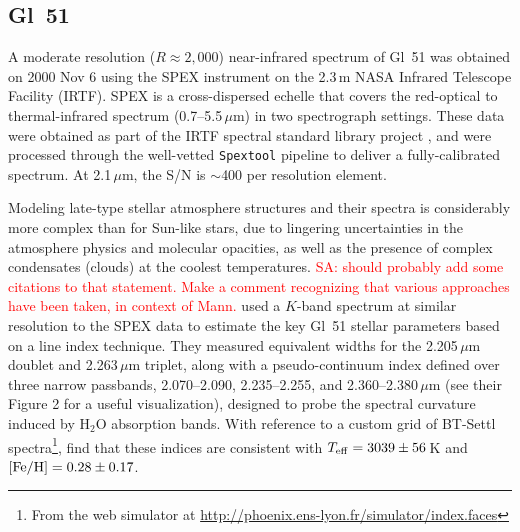 \documentclass[iop,floatfix]{emulateapj}
\newcommand{\comm}[1]{ \textcolor{red}{SA: #1}}
\begin{document}
\subsection{Gl~51}

A moderate resolution ($R\approx2,000$) near-infrared spectrum of Gl~51 was obtained on 2000 
Nov 6 using the SPEX instrument \citep{rayner03} on the 2.3\,m NASA Infrared Telescope Facility 
(IRTF).  SPEX is a cross-dispersed echelle that covers the red-optical to thermal-infrared spectrum 
(0.7--5.5\,$\mu$m) in two spectrograph settings.  These data were obtained as part of the IRTF 
spectral standard library project \citep{cushing05,rayner09}, and were processed through the 
well-vetted {\tt Spextool} pipeline \citep{cushing04,vacca03} to deliver a fully-calibrated 
spectrum.  At 2.1\,$\mu$m, the S/N is $\sim$400 per resolution element.

Modeling late-type stellar atmosphere structures and their spectra is considerably more complex 
than for Sun-like stars, due to lingering uncertainties in the atmosphere physics and molecular 
opacities, as well as the presence of complex condensates (clouds) at the coolest temperatures.  
\comm{should probably add some citations to that statement.  Make a comment recognizing that 
various approaches have been taken, in context of Mann.}  \citet{rojas-ayala12} used a $K$-band 
spectrum at similar resolution to the SPEX data to estimate the key Gl~51 stellar parameters based 
on a line index technique.  They measured equivalent widths for the 2.205\,$\mu$m  
doublet and 2.263\,$\mu$m  triplet, along with a pseudo-continuum index defined over 
three narrow passbands, 2.070--2.090, 2.235--2.255, and 2.360--2.380\,$\mu$m (see their Figure 2 
for a useful visualization), designed to probe the spectral curvature induced by H$_2$O absorption 
bands.  With reference to a custom grid of {\sc BT-Settl} spectra\footnote{From the web simulator at \url{http://phoenix.ens-lyon.fr/simulator/index.faces}}, \citet{rojas-ayala12} find that 
these indices are consistent with $T_{\rm eff} = 3039\pm56$\,K and $[{\rm Fe/H}] = 0.28\pm0.17$.  
\end{document}
